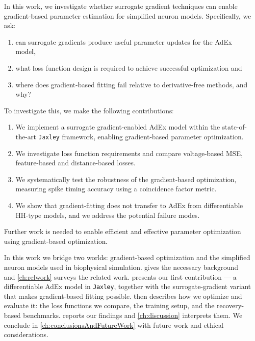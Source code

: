 In this work, we investigate whether surrogate gradient techniques can enable gradient-based parameter estimation for simplified neuron models.
Specifically, we ask:
\begin{enumerate}
  \item can surrogate gradients produce useful parameter updates for the \gls{AdEx} model,
  \item what loss function design is required to achieve successful optimization and
  \item where does gradient-based fitting fail relative to derivative-free methods, and why?
\end{enumerate}
To investigate this, we make the following contributions:
\begin{enumerate}
  \item We implement a surrogate gradient-enabled \gls{AdEx} model within the state-of-the-art \texttt{Jaxley} framework, enabling gradient-based parameter optimization.
  \item We investigate loss function requirements and compare voltage-based \gls{MSE}, feature-based and distance-based losses.
  \item We systematically test the robustness of the gradient-based optimization, measuring spike timing accuracy using a coincidence factor metric.
  \item We show that gradient-fitting does not transfer to \gls{AdEx} from differentiable \gls{HH}-type models, and we address the potential failure modes.
\end{enumerate}
Further work is needed to enable efficient and effective parameter optimization using gradient-based optimization.

In this work we bridge two worlds: gradient-based optimization and the simplified neuron models used in biophysical simulation.
 gives the necessary background and \cref{ch:relwork} surveys the related work.
 presents our first contribution --- a differentiable \gls{AdEx} model in \texttt{Jaxley}, together with the surrogate-gradient variant that makes gradient-based fitting possible.
 then describes how we optimize and evaluate it: the loss functions we compare, the training setup, and the recovery-based benchmarks.
 reports our findings and \cref{ch:discussion} interprets them.
We conclude in \cref{ch:conclusionsAndFutureWork} with future work and ethical considerations.
